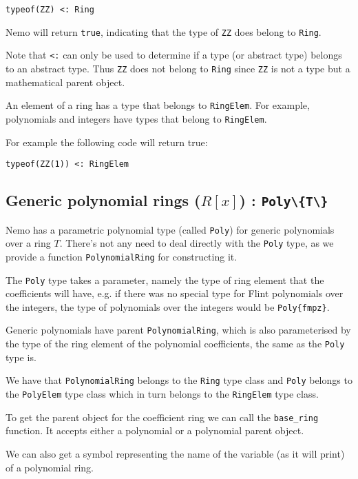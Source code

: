\documentclass[a4paper,10pt]{article}
\newcommand{\code}{\lstinline}
\begin{document}
\begin{lstlisting}
typeof(ZZ) <: Ring
\end{lstlisting}

Nemo will return \code{true}, indicating that the type of \code{ZZ} does belong to \code{Ring}.

Note that \code{<:} can only be used to determine if a type (or abstract type) belongs to an abstract
type. Thus \code{ZZ} does not belong to \code{Ring} since \code{ZZ} is not a type but a mathematical
parent object.

An element of a ring has a type that belongs to \code{RingElem}. For example, polynomials and integers
have types that belong to \code{RingElem}.

For example the following code will return true:

\begin{lstlisting}
typeof(ZZ(1)) <: RingElem
\end{lstlisting}

\subsection{Generic polynomial rings ($R[x]$) : \code|Poly\{T\}|}

Nemo has a parametric polynomial type (called \code{Poly}) for generic polynomials over
a ring $T$. There's not any need to deal directly with the \code{Poly} type, as we
provide a function \code{PolynomialRing} for constructing it.

The \code{Poly} type takes a parameter, namely the type of ring element that the
coefficients will have, e.g. if there was no special type for Flint polynomials over the
integers, the type of polynomials over the integers would be \code|Poly{fmpz}|.

Generic polynomials have parent \code{PolynomialRing}, which is also parameterised by the
type of the ring element of the polynomial coefficients, the same as the \code{Poly}
type is.

We have that \code{PolynomialRing} belongs to the \code{Ring} type class and \code{Poly}
belongs to the \code{PolyElem} type class which in turn belongs to the \code{RingElem}
type class.

To get the parent object for the coefficient ring we can call the \code{base_ring}
function. It accepts either a polynomial or a polynomial parent object.

We can also get a symbol representing the name of the variable (as it will print) of
a polynomial ring.
\end{document}
